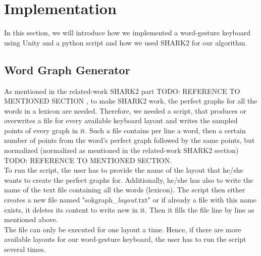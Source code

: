\chapter{Implementation}

In this section, we will introduce how we implemented a word-gesture keyboard using Unity and a python script and how we used SHARK2 for our algorithm.

\section*{Word Graph Generator}
As mentioned in the related-work SHARK2 part TODO: REFERENCE TO MENTIONED SECTION , to make SHARK2 work, the perfect graphs for all the words in a lexicon are needed. Therefore, we needed a script, that produces or overwrites a file for every available keyboard layout and writes the sampled points of every graph in it. Such a file contains per line a word, then a certain number of points from the word's perfect graph followed by the same points, but normalized (normalized as mentioned in the related-work SHARK2 section) TODO: REFERENCE TO MENTIONED SECTION.\\
To run the script, the user has to provide the name of the layout that he/she wants to create the perfect graphs for. Additionally, he/she has also to write the name of the text file containing all the words (lexicon). The script then either creates a new file named "sokgraph\_\textit{layout}.txt" or if already a file with this name exists, it deletes its content to write new in it. Then it fills the file line by line as mentioned above.\\
The file can only be executed for one layout a time. Hence, if there are more available layouts for our word-gesture keyboard, the user has to run the script several times.

